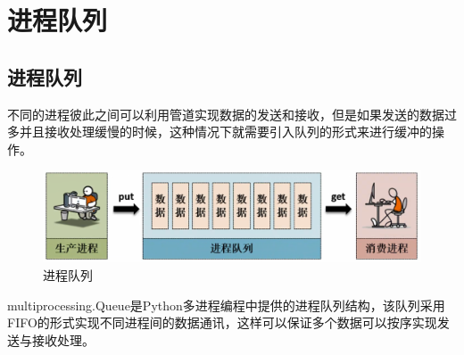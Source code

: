 \newpage

\section{进程队列}

\subsection{进程队列}

不同的进程彼此之间可以利用管道实现数据的发送和接收，但是如果发送的数据过多并且接收处理缓慢的时候，这种情况下就需要引入队列的形式来进行缓冲的操作。

\begin{figure}[H]
	\centering
	\includegraphics[scale=0.6]{img/C11/11-5/1.png}
	\caption{进程队列}
\end{figure}

multiprocessing.Queue是Python多进程编程中提供的进程队列结构，该队列采用FIFO的形式实现不同进程间的数据通讯，这样可以保证多个数据可以按序实现发送与接收处理。

\begin{table}[H]
	\centering
	\caption{multiprocessing.Queue类}
\end{table}

